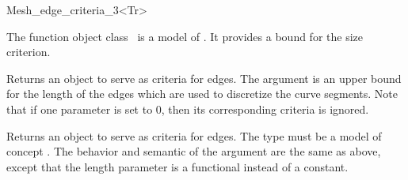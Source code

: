 \ccRefPageBegin


\begin{ccRefFunctionObjectClass}{Mesh_edge_criteria_3<Tr>}  %


\ccDefinition
  
The function object class \ccRefName\ is a model of . It
provides a bound for the size criterion.


\ccIsModel


\ccTypes


\ccCreation
{}  %

{Returns an object to serve as criteria for edges. 
The argument  is an upper bound
for the length of the edges which are used to discretize the curve segments.
Note that if one parameter is set to 0, then its corresponding criteria is ignored.}

{Returns an object to serve as criteria for edges. The type  
must be a model of concept . The behavior and semantic of the argument are the same 
as above, except that the length 
 parameter is a functional instead of a constant.}


\ccSeeAlso

 \\
 \\
 \\
 \\

\end{ccRefFunctionObjectClass}

\ccRefPageEnd

